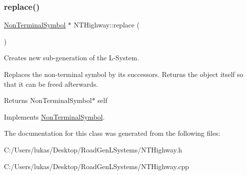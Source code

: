 \subsubsection{\texorpdfstring{replace()}{replace()}}
{\footnotesize\ttfamily \hyperlink{class_non_terminal_symbol}{Non\+Terminal\+Symbol} $\ast$ N\+T\+Highway\+::replace (\begin{DoxyParamCaption}{ }\end{DoxyParamCaption})\hspace{0.3cm}{\ttfamily [virtual]}}



Creates new sub-\/generation of the L-\/\+System. 

Replaces the non-\/terminal symbol by its successors. Returns the object itself so that it can be freed afterwards.

\begin{DoxyReturn}{Returns}
Non\+Terminal\+Symbol$\ast$ self 
\end{DoxyReturn}


Implements \hyperlink{class_non_terminal_symbol_ade38f1475002e4f8b41e23d9c787e5e0}{Non\+Terminal\+Symbol}.



The documentation for this class was generated from the following files\+:\begin{DoxyCompactItemize}
\item 
C\+:/\+Users/lukas/\+Desktop/\+Road\+Gen\+L\+Systems/N\+T\+Highway.\+h\item 
C\+:/\+Users/lukas/\+Desktop/\+Road\+Gen\+L\+Systems/N\+T\+Highway.\+cpp\end{DoxyCompactItemize}
